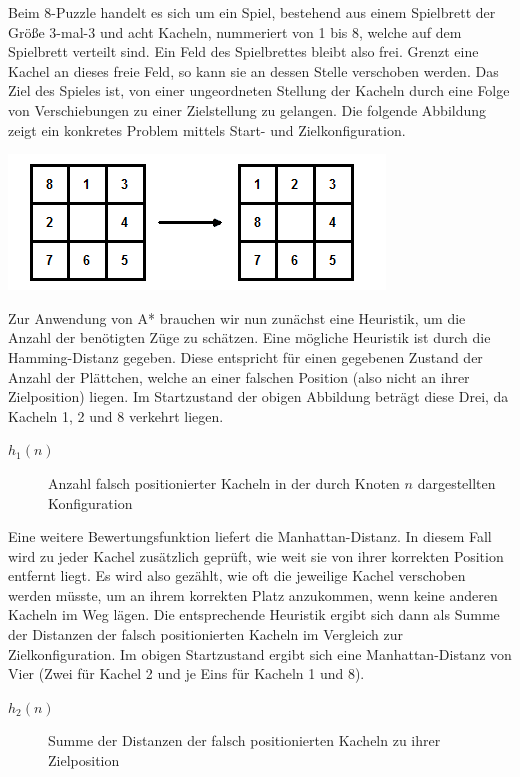 Beim 8-Puzzle handelt es sich um ein Spiel, bestehend aus einem Spielbrett der Größe 3-mal-3 und acht Kacheln, nummeriert von 1 bis 8, welche auf dem Spielbrett verteilt sind. Ein Feld des Spielbrettes bleibt also frei. Grenzt eine Kachel an dieses freie Feld, so kann sie an dessen Stelle verschoben werden. Das Ziel des Spieles ist, von einer ungeordneten Stellung der Kacheln durch eine Folge von Verschiebungen zu einer Zielstellung zu gelangen.
Die folgende Abbildung zeigt ein konkretes Problem mittels Start- und Zielkonfiguration.

\includegraphics[scale=0.7]{chapters/informed_search/startziel.png}

Zur Anwendung von A* brauchen wir nun zunächst eine Heuristik, um die Anzahl der benötigten Züge zu schätzen. Eine mögliche Heuristik ist durch die Hamming-Distanz gegeben. Diese entspricht für einen gegebenen Zustand der Anzahl der Plättchen, welche an einer falschen Position (also nicht an ihrer Zielposition) liegen. Im Startzustand der obigen Abbildung beträgt diese Drei, da Kacheln 1, 2 und 8 verkehrt liegen.

\begin{description}
	\item[$h_{1}(n)$]{Anzahl falsch positionierter Kacheln in der durch Knoten $n$ dargestellten Konfiguration}
\end{description}

Eine weitere Bewertungsfunktion liefert die Manhattan-Distanz. In diesem Fall wird zu jeder Kachel zusätzlich geprüft, wie weit sie von ihrer korrekten Position entfernt liegt. Es wird also gezählt, wie oft die jeweilige Kachel verschoben werden müsste, um an ihrem korrekten Platz anzukommen, wenn keine anderen Kacheln im Weg lägen. Die entsprechende Heuristik ergibt sich dann als Summe der Distanzen der falsch positionierten Kacheln im Vergleich zur Zielkonfiguration. Im obigen Startzustand ergibt sich eine Manhattan-Distanz von Vier (Zwei für Kachel 2 und je Eins für Kacheln 1 und 8).

\begin{description}
	\item[$h_{2}(n)$]{Summe der Distanzen der falsch positionierten Kacheln zu ihrer Zielposition}
\end{description}

